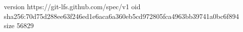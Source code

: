 version https://git-lfs.github.com/spec/v1
oid sha256:70d75d288ee63f246ed1e6aca6a360eb5cd972805fca4963bb39741a0bc6f894
size 56829
